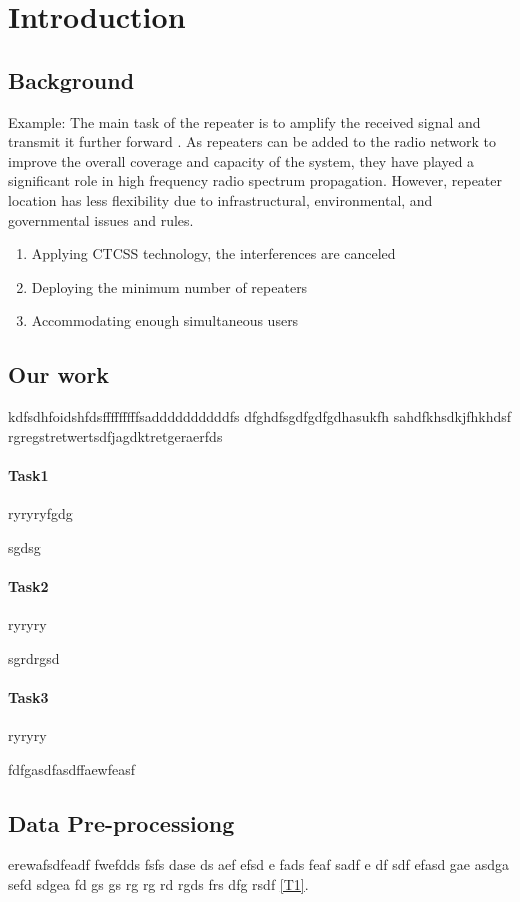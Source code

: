 \documentclass[12pt]{article}
\begin{document}
\clearpage
\pagestyle{fancy}
\tableofcontents 
\contentsname
\newpage
\setcounter{page}{1}
\section{Introduction}
\subsection{Background}
Example: The main task of the repeater is to amplify the received signal and transmit it further forward \cite{Gyaourova2002,MaLZhangY2021}. As repeaters can be added to the radio network to improve the overall coverage and capacity of the system\cite{PRASAD2014}, they have played a significant role in high frequency radio spectrum propagation\cite{Gyaourova2002}. However, repeater location has less flexibility due to infrastructural, environmental, and governmental issues and rules.
\begin{enumerate}
    \item Applying CTCSS technology, the interferences are canceled
    \item Deploying the minimum number of repeaters
    \item Accommodating enough simultaneous users
\end{enumerate}

\subsection{Our work}
kdfsdhfoidshfdsfffffffffsaddddddddddfs
dfghdfsgdfgdfgdhasukfh
sahdfkhsdkjfhkhdsf
rgregstretwertsdfjagdktretgeraerfds
\paragraph{Task1}
ryryryfgdg

sgdsg%

\paragraph{Task2}
ryryry

sgrdrgsd
\paragraph{Task3}
ryryry

fdfgasdfasdffaewfeasf

\subsection{Data Pre-processiong}
erewafsdfeadf fwefdds fsfs dase ds aef efsd e fads feaf sadf e
df sdf efasd gae asdga sefd sdgea fd gs gs
rg rg rd rgds frs dfg rsdf  \ref{T1}.
\end{document}
